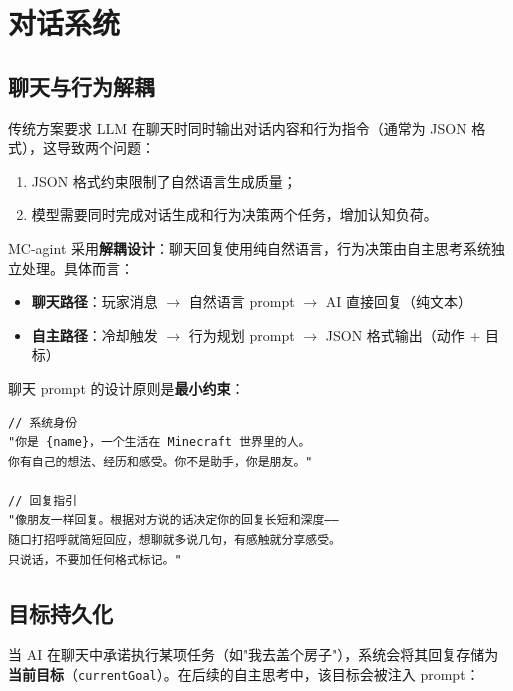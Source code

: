 \documentclass[12pt,a4paper]{article}
\begin{document}
\section{对话系统}

\subsection{聊天与行为解耦}

传统方案要求 LLM 在聊天时同时输出对话内容和行为指令（通常为 JSON 格式），这导致两个问题：

\begin{enumerate}
    \item JSON 格式约束限制了自然语言生成质量；
    \item 模型需要同时完成对话生成和行为决策两个任务，增加认知负荷。
\end{enumerate}

MC-agint 采用\textbf{解耦设计}：聊天回复使用纯自然语言，行为决策由自主思考系统独立处理。具体而言：

\begin{itemize}
    \item \textbf{聊天路径}：玩家消息 $\rightarrow$ 自然语言 prompt $\rightarrow$ AI 直接回复（纯文本）
    \item \textbf{自主路径}：冷却触发 $\rightarrow$ 行为规划 prompt $\rightarrow$ JSON 格式输出（动作 + 目标）
\end{itemize}

聊天 prompt 的设计原则是\textbf{最小约束}：

\begin{lstlisting}[caption={聊天 Prompt 核心设计},label={lst:chat_prompt}]
// 系统身份
"你是 {name}，一个生活在 Minecraft 世界里的人。
你有自己的想法、经历和感受。你不是助手，你是朋友。"

// 回复指引
"像朋友一样回复。根据对方说的话决定你的回复长短和深度——
随口打招呼就简短回应，想聊就多说几句，有感触就分享感受。
只说话，不要加任何格式标记。"
\end{lstlisting}

\subsection{目标持久化}

当 AI 在聊天中承诺执行某项任务（如"我去盖个房子"），系统会将其回复存储为\textbf{当前目标}（\texttt{currentGoal}）。在后续的自主思考中，该目标会被注入 prompt：
\end{document}
